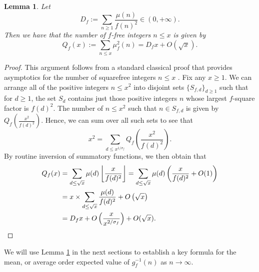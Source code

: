 \documentclass[11pt,reqno,a4letter]{article}
\numberwithin{figure}{section}
\numberwithin{table}{section}
\newcommand{\Floor}[2]{\ensuremath{\left\lfloor \frac{#1}{#2} \right\rfloor}}
\theoremstyle{plain}
\newtheorem{lemma}[theorem]{Lemma}
\numberwithin{theorem}{section}
\theoremstyle{definition}
\begin{document}
\begin{lemma}
\label{lemma_Qfx_fSqFreeSummatoryFunc_v1}
Let 
\[
D_f := \sum_{n \geq 1} \frac{\mu(n)}{f(n)^2} \in (0, +\infty). 
\]
Then we have that the number of $f$-free integers $n \leq x$ is given by 
\[
Q_f(x) := \sum_{n \leq x} \mu_f^2(n) = D_f x + O\left(\sqrt{x}\right). 
\]
\end{lemma}
\begin{proof}
This argument follows from a standard classical proof that provides asymptotics 
for the number of squarefree integers $n \leq x$ \cite[\S 18.6]{HARDYWRIGHTNUMT}. 
Fix any $x \geq 1$. We can arrange all of the positive integers $n \leq x^2$ 
into disjoint sets $\{S_{f,d}\}_{d \geq 1}$ such that for $d \geq 1$, 
the set $S_d$ contains just those positive integers $n$ whose largest $f$-square 
factor is $f(d)^2$. The number of $n \leq x^2$ such that $n \in S_{f,d}$ is 
given by $Q_f\left(\frac{x^2}{f(d)^2}\right)$. 
Hence, we can sum over all such sets to see that 
\[
x^2 = \sum_{d \leq x^{1/\sigma_f}} Q_f\left(\frac{x^2}{f(d)^2}\right). 
\]
By routine inversion of summatory functions, we then obtain that 
\begin{align*}
Q_f(x) & = \sum_{d \leq \sqrt{x}} \mu(d) \Floor{x}{f(d)^2} = \sum_{d \leq \sqrt{x}} 
     \mu(d) \left(\frac{x}{f(d)^2} + O(1)\right) \\ 
     & = x \times \sum_{d \leq \sqrt{x}} \frac{\mu(d)}{f(d)^2} + O\left(\sqrt{x}\right) \\ 
     & = D_f x + O\left(\frac{x}{x^{2/\sigma_f}}\right) + O(\sqrt{x}). 
     \qedhere
\end{align*}
\end{proof}

We will use Lemma \ref{lemma_Qfx_fSqFreeSummatoryFunc_v1} in the next sections to 
establish a key formula for the mean, or average order expected value of 
$g_f^{-1}(n)$ as $n \rightarrow \infty$. 
\end{document}
